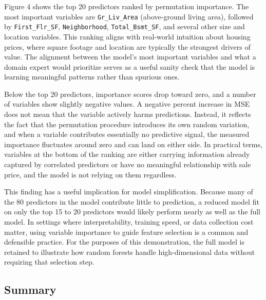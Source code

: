 \documentclass[
  11pt,
  letterpaper,
]{article}
\begin{document}
Figure 4 shows the top 20 predictors ranked by permutation importance.
The most important variables are \texttt{Gr\_Liv\_Area} (above-ground
living area), followed by \texttt{First\_Flr\_SF},
\texttt{Neighborhood}, \texttt{Total\_Bsmt\_SF}, and several other size
and location variables. This ranking aligns with real-world intuition
about housing prices, where square footage and location are typically
the strongest drivers of value. The alignment between the model's most
important variables and what a domain expert would prioritize serves as
a useful sanity check that the model is learning meaningful patterns
rather than spurious ones.

Below the top 20 predictors, importance scores drop toward zero, and a
number of variables show slightly negative values. A negative percent
increase in MSE does not mean that the variable actively harms
predictions. Instead, it reflects the fact that the permutation
procedure introduces its own random variation, and when a variable
contributes essentially no predictive signal, the measured importance
fluctuates around zero and can land on either side. In practical terms,
variables at the bottom of the ranking are either carrying information
already captured by correlated predictors or have no meaningful
relationship with sale price, and the model is not relying on them
regardless.

This finding has a useful implication for model simplification. Because
many of the 80 predictors in the model contribute little to prediction,
a reduced model fit on only the top 15 to 20 predictors would likely
perform nearly as well as the full model. In settings where
interpretability, training speed, or data collection cost matter, using
variable importance to guide feature selection is a common and
defensible practice. For the purposes of this demonstration, the full
model is retained to illustrate how random forests handle
high-dimensional data without requiring that selection step.

\subsection{Summary}\label{summary}
\end{document}
